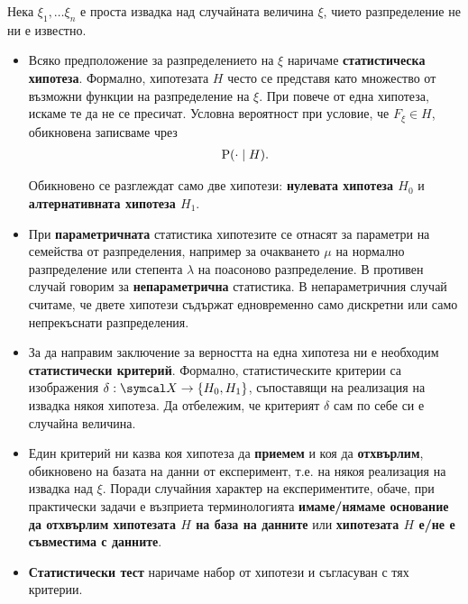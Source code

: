 \documentclass[numbers=endperiod, bibliography=totocnumbered]{scrartcl}
\begin{document}
\begin{definition}[Хипотези]
  Нека \( \xi_1, \ldots \xi_n \) е проста извадка над случайната величина \( \xi \), чието разпределение не ни е известно.

  \begin{itemize}
    \item Всяко предположение за разпределението на \( \xi \) наричаме \textbf{статистическа хипотеза}. Формално, хипотезата \( H \) често се представя като множество от възможни функции на разпределение на \( \xi \). При повече от една хипотеза, искаме те да не се пресичат. Условна вероятност при условие, че \( F_\xi \in H \), обикновена записваме чрез
    \begin{align*}
      \operatorname{P}(\cdot \mid H).
    \end{align*}

    Обикновено се разглеждат само две хипотези: \textbf{нулевата хипотеза \( H_0 \)} и \textbf{алтернативната хипотеза \( H_1 \)}.

    \item При \textbf{параметричната} статистика хипотезите се отнасят за параметри на семейства от разпределения, например за очакването \( \mu \) на нормално разпределение или степента \( \lambda \) на поасоново разпределение. В противен случай говорим за \textbf{непараметрична} статистика. В непараметричния случай считаме, че двете хипотези съдържат едновременно само дискретни или само непрекъснати разпределения.

    \item За да направим заключение за верността на една хипотеза ни е необходим \textbf{статистически критерий}. Формално, статистическите критерии са изображения \( \delta: \SampleSpace \to \{ H_0, H_1 \} \), съпоставящи на реализация на извадка някоя хипотеза. Да отбележим, че критерият \( \delta \) сам по себе си е случайна величина.

    \item Един критерий ни казва коя хипотеза да \textbf{приемем} и коя да \textbf{отхвърлим}, обикновено на базата на данни от експеримент, т.е. на някоя реализация на извадка над \( \xi \). Поради случайния характер на експериментите, обаче, при практически задачи е възприета терминологията \textbf{имаме/нямаме основание да отхвърлим хипотезата \( H \) на база на данните} или \textbf{хипотезата \( H \) е/не е съвместима с данните}.

    \item \textbf{Статистически тест} наричаме набор от хипотези и съгласуван с тях критерии.


\end{itemize}
\end{definition}
\end{document}
